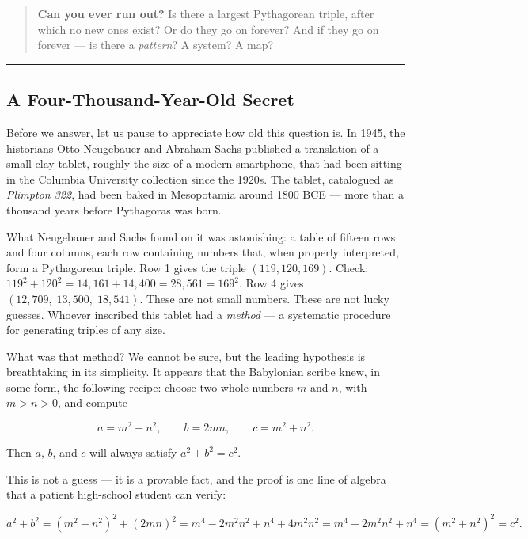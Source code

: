 \documentclass[12pt, letterpaper, openany]{book}
\theoremstyle{definition}
\theoremstyle{remark}
\begin{document}
\begin{quote}
\textbf{Can you ever run out?} Is there a largest Pythagorean triple, after which no new ones exist? Or do they go on forever? And if they go on forever --- is there a \textit{pattern}? A system? A map?
\end{quote}



\bigskip\noindent\rule{\textwidth}{0.4pt}\bigskip



\subsection*{A Four-Thousand-Year-Old Secret}


Before we answer, let us pause to appreciate how old this question is. In 1945, the historians Otto Neugebauer and Abraham Sachs published a translation of a small clay tablet, roughly the size of a modern smartphone, that had been sitting in the Columbia University collection since the 1920s. The tablet, catalogued as \textit{Plimpton 322}, had been baked in Mesopotamia around 1800 BCE --- more than a thousand years before Pythagoras was born.

What Neugebauer and Sachs found on it was astonishing: a table of fifteen rows and four columns, each row containing numbers that, when properly interpreted, form a Pythagorean triple. Row 1 gives the triple $(119, 120, 169)$. Check: $119^2 + 120^2 = 14{,}161 + 14{,}400 = 28{,}561 = 169^2$. Row 4 gives $(12{,}709,\; 13{,}500,\; 18{,}541)$. These are not small numbers. These are not lucky guesses. Whoever inscribed this tablet had a \textit{method} --- a systematic procedure for generating triples of any size.

What was that method? We cannot be sure, but the leading hypothesis is breathtaking in its simplicity. It appears that the Babylonian scribe knew, in some form, the following recipe: choose two whole numbers $m$ and $n$, with $m > n > 0$, and compute

\[
a = m^2 - n^2, \qquad b = 2mn, \qquad c = m^2 + n^2.
\]

Then $a$, $b$, and $c$ will always satisfy $a^2 + b^2 = c^2$.

This is not a guess --- it is a provable fact, and the proof is one line of algebra that a patient high-school student can verify:

\[
a^2 + b^2 = (m^2 - n^2)^2 + (2mn)^2 = m^4 - 2m^2 n^2 + n^4 + 4m^2 n^2 = m^4 + 2m^2 n^2 + n^4 = (m^2 + n^2)^2 = c^2.
\]
\end{document}
